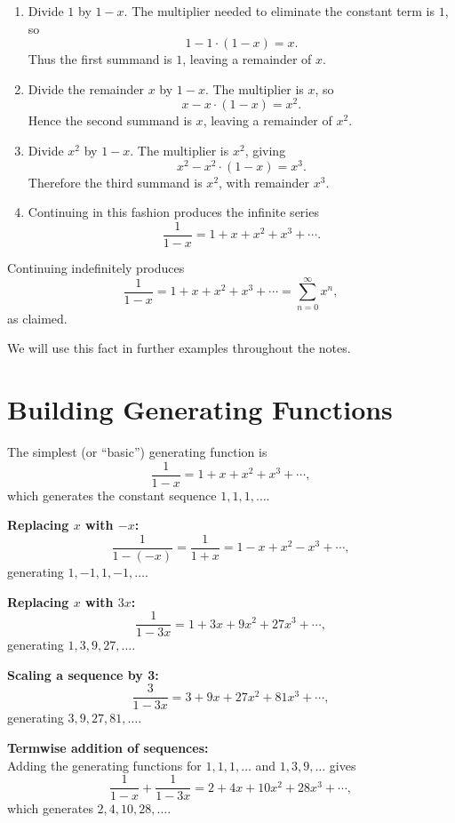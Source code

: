 \documentclass{article}
\begin{document}
\begin{enumerate}
  \item Divide \(1\) by \(1-x\). The multiplier needed to eliminate the constant term is \(1\), so 
  \[
    1 - 1\cdot(1-x) = x.
  \]
  Thus the first summand is \(1\), leaving a remainder of \(x\).

  \item Divide the remainder \(x\) by \(1-x\). The multiplier is \(x\), so
  \[
    x - x\cdot(1-x) = x^2.
  \]
  Hence the second summand is \(x\), leaving a remainder of \(x^2\).

  \item Divide \(x^2\) by \(1-x\). The multiplier is \(x^2\), giving
  \[
    x^2 - x^2\cdot(1-x) = x^3.
  \]
  Therefore the third summand is \(x^2\), with remainder \(x^3\).

  \item Continuing in this fashion produces the infinite series
  \[
    \frac{1}{1-x} = 1 + x + x^2 + x^3 + \cdots.
  \]
\end{enumerate}


Continuing indefinitely produces
\[
\frac{1}{1-x} = 1 + x + x^2 + x^3 + \cdots = \sum_{n=0}^\infty x^n,
\]
as claimed. \par
\noindent We will use this fact in further examples throughout the notes.

\section{Building Generating Functions}

The simplest (or “basic”) generating function is
\[
\frac{1}{1-x} = 1 + x + x^2 + x^3 + \cdots,
\]
which generates the constant sequence \(1,1,1,\dots\).

\medskip
\noindent
\textbf{Replacing \(x\) with \(-x\):}
\[
\frac{1}{1-(-x)} = \frac{1}{1+x} = 1 - x + x^2 - x^3 + \cdots,
\]
generating \(1,-1,1,-1,\dots\).

\medskip
\noindent
\textbf{Replacing \(x\) with \(3x\):}
\[
\frac{1}{1-3x} = 1 + 3x + 9x^2 + 27x^3 + \cdots,
\]
generating \(1,3,9,27,\dots\).

\medskip
\noindent
\textbf{Scaling a sequence by 3:}
\[
\frac{3}{1-3x} = 3 + 9x + 27x^2 + 81x^3 + \cdots,
\]
generating \(3,9,27,81,\dots\).

\medskip
\noindent
\textbf{Termwise addition of sequences:}\\
Adding the generating functions for \(1,1,1,\dots\) and \(1,3,9,\dots\) gives
\[
\frac{1}{1-x} + \frac{1}{1-3x}
= 2 + 4x + 10x^2 + 28x^3 + \cdots,
\]
which generates \(2,4,10,28,\dots\).
\end{document}
